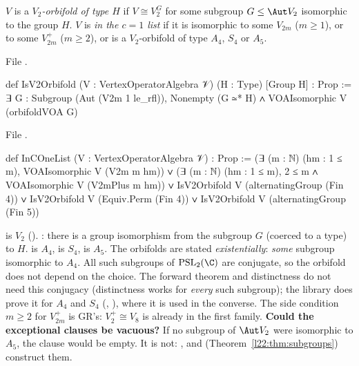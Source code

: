 \begin{definition}\label{l22:def:list}
$V$ is a \emph{$V_2$-orbifold of type $H$} if $V\cong V_2^G$ for some subgroup $G\le\Aut V_2$ isomorphic to
the group $H$. $V$ is \emph{in the $c=1$ list} if it is isomorphic to some $V_{2m}$ ($m\ge1$), or to some
$V_{2m}^+$ ($m\ge2$), or is a $V_2$-orbifold of type $A_4$, $S_4$ or $A_5$.
\end{definition}
\noindent File .
\begin{leancode}
def IsV2Orbifold (V : VertexOperatorAlgebra 𝒱) (H : Type) [Group H] : Prop :=
  ∃ G : Subgroup (Aut (V2m 1 le_rfl)), Nonempty (G ≃* H) ∧ VOAIsomorphic V (orbifoldVOA G)
\end{leancode}
\noindent File .
\begin{leancode}
def InCOneList (V : VertexOperatorAlgebra 𝒱) : Prop :=
  (∃ (m : ℕ) (hm : 1 ≤ m), VOAIsomorphic V (V2m m hm)) ∨
  (∃ (m : ℕ) (hm : 1 ≤ m), 2 ≤ m ∧ VOAIsomorphic V (V2mPlus m hm)) ∨
  IsV2Orbifold V (alternatingGroup (Fin 4)) ∨
  IsV2Orbifold V (Equiv.Perm (Fin 4)) ∨
  IsV2Orbifold V (alternatingGroup (Fin 5))
\end{leancode}

\begin{dictionary}
 is $V_2$ (). : there is a group isomorphism
from the subgroup $G$ (coerced to a type) to $H$.  is $A_4$,
 is $S_4$,  is $A_5$. The orbifolds are stated
\emph{existentially}: \emph{some} subgroup isomorphic to $A_4$. All such subgroups of $\mathrm{PSL}_2(\C)$ are
conjugate, so the orbifold does not depend on the choice. The forward theorem and distinctness do not need this
conjugacy (distinctness works for \emph{every} such subgroup); the library does prove it for $A_4$ and $S_4$
(, ), where it is used in the converse.
The side condition $m\ge2$ for $V_{2m}^+$ is GR's: $V_2^+\cong V_8$ is already in the first family.
\textbf{Could the exceptional clauses be vacuous?} If no subgroup of $\Aut V_2$ were isomorphic to $A_5$, the
clause would be empty. It is not: ,  and
 (Theorem~\ref{l22:thm:subgroups}) construct them.
\end{dictionary}

